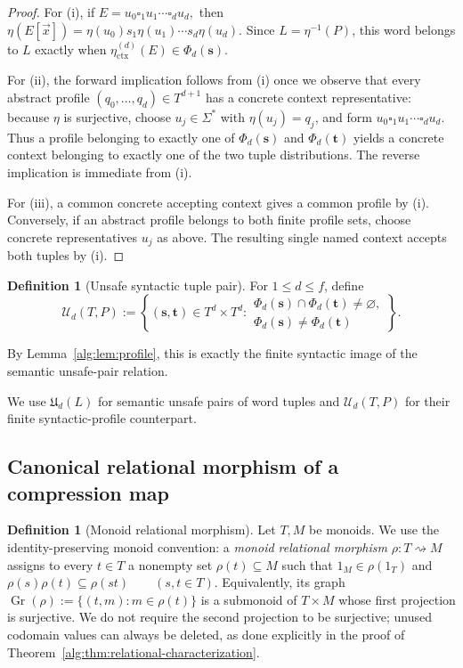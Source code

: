 \documentclass[10pt,a4paper]{article}
\theoremstyle{definition}
\newtheorem{definition}[theorem]{Definition}
\theoremstyle{remark}
\newcommand{\blank}{\square}
\newcommand{\relto}{\mathrel{\rightsquigarrow}}
\begin{document}
\begin{proof}
For (i), if
\(E=u_0\blank_1u_1\cdots\blank_du_d,\)
then \(\eta(E[\vec x]) = \eta(u_0)s_1\eta(u_1)\cdots s_d\eta(u_d).\) Since \(L=\eta^{-1}(P)\), this word belongs to \(L\) exactly when
\(\eta_{\mathrm{ctx}}^{(d)}(E)\in\Phi_d(\mathbf s)\).

For (ii), the forward implication follows from (i) once we observe that every
abstract profile
\((q_0,\ldots,q_d)\in T^{d+1}\)
has a concrete context representative: because \(\eta\) is surjective, choose
\(u_j\in\Sigma^*\) with \(\eta(u_j)=q_j\), and form
\(u_0\blank_1u_1\cdots\blank_du_d.\)
Thus a profile belonging to exactly one of
\(\Phi_d(\mathbf s)\) and \(\Phi_d(\mathbf t)\) yields a concrete context
belonging to exactly one of the two tuple distributions.
The reverse implication is immediate from (i).

For (iii), a common concrete accepting context gives a common profile by (i).
Conversely, if an abstract profile belongs to both finite profile sets, choose
concrete representatives \(u_j\) as above. The resulting single named
context accepts both tuples by (i).
\end{proof}

\begin{definition}[Unsafe syntactic tuple pair]
For \(1\le d\le f\), define
\[
\mathcal U_d(T,P)
:=
\left\{
(\mathbf s,\mathbf t)\in T^d\times T^d:
\begin{array}{l}
\Phi_d(\mathbf s)\cap\Phi_d(\mathbf t)\neq\varnothing,\\
\Phi_d(\mathbf s)\neq\Phi_d(\mathbf t)
\end{array}
\right\}.
\]
\end{definition}

By Lemma~\ref{alg:lem:profile}, this is exactly the finite syntactic image of the
semantic unsafe-pair relation.

We use \(\mathfrak U_d(L)\) for semantic unsafe pairs of word tuples and
\(\mathcal U_d(T,P)\) for their finite syntactic-profile counterpart.

\subsection{Canonical relational morphism of a compression map}

\begin{definition}[Monoid relational morphism]
Let \(T,M\) be monoids.  We use the identity-preserving monoid convention: a
\emph{monoid relational morphism} \(\rho:T\relto M\) assigns to every \(t\in T\)
a nonempty set \(\rho(t)\subseteq M\) such that \(1_M\in\rho(1_T)\) and
\(
\rho(s)\rho(t)\subseteq\rho(st)
\qquad(s,t\in T).
\)
Equivalently, its graph
\(
\operatorname{Gr}(\rho)
:=
\{(t,m):m\in\rho(t)\}
\)
is a submonoid of \(T\times M\) whose first projection is surjective.  We do
not require the second projection to be surjective; unused codomain values can
always be deleted, as done explicitly in the proof of
Theorem~\ref{alg:thm:relational-characterization}.
\end{definition}
\end{document}
